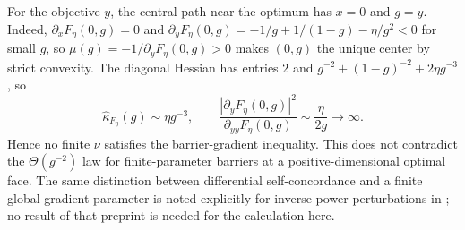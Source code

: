 For the objective $y$, the central path near the optimum has $x=0$
and $g=y$. Indeed, $\partial_xF_\eta(0,g)=0$ and
$\partial_yF_\eta(0,g)=-1/g+1/(1-g)-\eta/g^2<0$ for small $g$,
so $\mu(g)=-1/\partial_yF_\eta(0,g)>0$ makes $(0,g)$ the unique
center by strict convexity.
The diagonal Hessian has entries
$2$ and $g^{-2}+(1-g)^{-2}+2\eta g^{-3}$, so
\begin{equation}
 \widehat\kappa_{F_\eta}(g)\sim\eta g^{-3},\qquad
 \frac{|\partial_yF_\eta(0,g)|^2}
      {\partial_{yy}F_\eta(0,g)}\sim\frac{\eta}{2g}\longrightarrow\infty.
 \label{eq:infinite-parameter-rate}
\end{equation}
Hence no finite $\nu$ satisfies the barrier-gradient inequality.
This does not contradict the $\Theta(g^{-2})$ law for finite-parameter
barriers at a positive-dimensional optimal face. The same distinction
between differential self-concordance and a finite global gradient
parameter is noted explicitly for inverse-power perturbations in
\citet[Remark 11.1]{monteirodasilva2026}; no result of that preprint
is needed for the calculation here.
